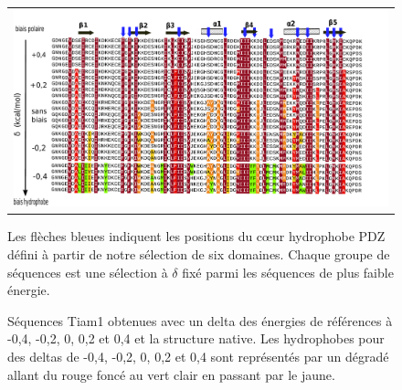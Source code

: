 \begin{figure}[!htbp]
  \caption{ Séquences Tiam1 obtenues avec un delta des énergies de références à -0,4, -0,2, 0, 0,2 et 0,4 et la structure native. Les hydrophobes pour des deltas de -0,4, -0,2, 0, 0,2 et 0,4 sont représentés par un dégradé allant du rouge foncé au vert clair en passant par le jaune.}
  \centering
  \begin{tabular}{c}
    \includegraphics[width=17cm]{titration/alignTiam1.pdf} \\
  \end{tabular}      
  \label{titrAlignTiam1}
        {\footnotesize Les flèches bleues indiquent les positions du cœur hydrophobe PDZ défini à partir de notre sélection de six domaines. Chaque groupe de séquences est une sélection à $\delta$ fixé parmi les séquences de plus faible énergie.}
        
\end{figure}

